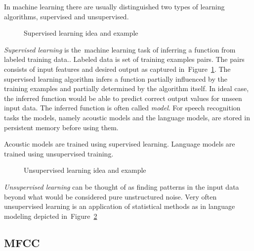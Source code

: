 In machine learning there are usually distinguished two types of learning algorithms, supervised and unsupervised.

\begin{figure}[!htp]
    \begin{center}
    
    
    \caption{Supervised learning idea and example}
    \label{fig:supervised} 
    \end{center}
\end{figure}
{\it Supervised learning} is the~machine learning task of inferring a function from labeled training data.\cite{mohri2012foundations}. Labeled data is set of training examples pairs. The pairs consists of input features and desired output as captured in~Figure~\ref{fig:supervised}. The supervised learning algorithm infers a function partially influenced by the training examples and partially determined by the algorithm itself. In ideal case, the inferred function would be able to predict correct output values for unseen input data. 
The inferred function is often called {\it model}. For speech recognition tasks the models, namely acoustic models and the language models, are stored in persistent memory before using them. 

Acoustic models are trained using supervised learning. Language models are trained using unsupervised training. 

\begin{figure}[!htp]
    \begin{center}
    
    
    \caption{Unsupervised learning idea and example}
    \label{fig:unsupervised} 
    \end{center}
\end{figure}
{\it Unsupervised learning} can be thought of as finding patterns in the input data beyond what would be considered pure unstructured noise\cite{ghahramani2004unsupervised}. Very often unsupervised learning is an application of statistical methods as in language modeling depicted in~Figure~\ref{fig:unsupervised}







\subsection[MFCC coefficients]{\ac{MFCC}}
\label{sub:mel_frequency_cepstrum_coefficients}



